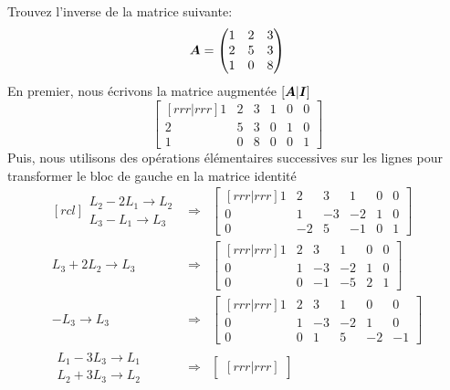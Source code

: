 \begin{exemple}\label{bloc-inv}
Trouvez l'inverse de la matrice suivante:
\[
\boldsymbol{A} = \begin{pmatrix}
1 & 2 & 3 \\
2 & 5 & 3 \\
1 & 0 & 8
\end{pmatrix}
\]
\solution
En premier, nous écrivons la matrice augmentée $[\boldsymbol{A}|\boldsymbol{I}]$
\[
\begin{bmatrix}[rrr|rrr]
1 & 2 & 3 & 1 & 0 & 0\\
2 & 5 & 3 & 0 & 1 & 0 \\
1 & 0 & 8 & 0 & 0 & 1
\end{bmatrix}
\]
Puis, nous utilisons des opérations élémentaires successives sur les lignes
pour transformer le bloc de gauche en la matrice identité
\[
\begin{matrix}[rcl]
    \begin{matrix}
    L_2 - 2 L_1 \rightarrow L_2 \\
    L_3 - L_1 \rightarrow L_3
    \end{matrix}
    &\Rightarrow&
    \begin{bmatrix}[rrr|rrr]
    1 & 2 & 3 & 1 & 0 & 0\\
    0 & 1 & -3 & -2 & 1 & 0 \\
    0 & -2 & 5 & -1 & 0 & 1
    \end{bmatrix}\\[20pt]
        L_3 + 2 L_2 \rightarrow L_3
    &\Rightarrow&
      \begin{bmatrix}[rrr|rrr]
    1 & 2 & 3 & 1 & 0 & 0\\
    0 & 1 & -3 & -2 & 1 & 0 \\
    0 & 0 & -1 & -5 & 2 & 1
    \end{bmatrix}\\[20pt]  
    -L_3 \rightarrow L_3
        &\Rightarrow&
      \begin{bmatrix}[rrr|rrr]
    1 & 2 & 3 & 1 & 0 & 0\\
    0 & 1 & -3 & -2 & 1 & 0 \\
    0 & 0 & 1 & 5 & -2 & -1
    \end{bmatrix}\\[20pt]    
    \begin{matrix}
    L_1 - 3L_3 \rightarrow L_1 \\
    L_2 + 3L_3 \rightarrow L_2
    \end{matrix}      
            &\Rightarrow&
      \begin{bmatrix}[rrr|rrr]

\end{bmatrix}
\end{matrix}\]
\end{exemple}

